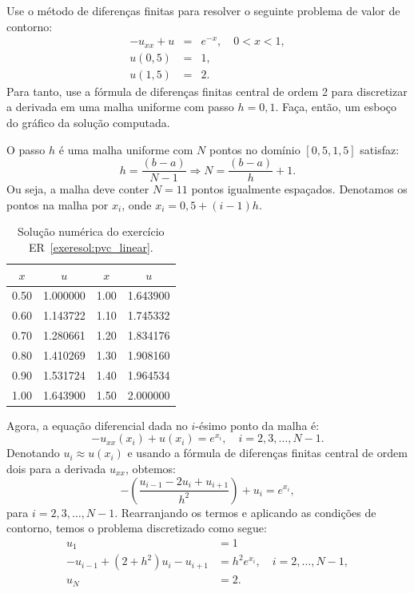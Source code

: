\begin{exeresol}\label{exeresol:pvc_linear} Use o método de diferenças finitas para resolver o seguinte problema de valor de contorno:
  \begin{eqnarray}
    -u_{xx} + u  &=& e^{-x},\quad 0<x<1,\\
    u(0,5) &=& 1,\\
    u(1,5) &=& 2.
  \end{eqnarray}
Para tanto, use a fórmula de diferenças finitas central de ordem 2 para discretizar a derivada em uma malha uniforme com passo $h=0,1$. Faça, então, um esboço do gráfico da solução computada.
\end{exeresol}
\begin{resol}
O passo $h$ é uma malha uniforme com $N$ pontos no domínio $[0,5, 1,5]$ satisfaz:
\begin{equation*}
  h = \frac{(b-a)}{N-1} \Rightarrow N = \frac{(b-a)}{h} + 1.
\end{equation*}
Ou seja, a malha deve conter $N = 11$ pontos igualmente espaçados. Denotamos os pontos na malha por $x_i$, onde $x_i = 0,5 + (i-1)h$.

\begin{table}
  \centering
  \begin{tabular}{cc|cc}
    $x$ & $u$ & $x$ & $u$\\\hline
0.50 & 1.000000 & 1.00 & 1.643900 \\
0.60 & 1.143722 & 1.10 & 1.745332 \\
0.70 & 1.280661 & 1.20 & 1.834176 \\
0.80 & 1.410269 & 1.30 & 1.908160 \\
0.90 & 1.531724 & 1.40 & 1.964534 \\
1.00 & 1.643900 & 1.50 & 2.000000 \\\hline
  \end{tabular}
  \caption{Solução numérica do exercício ER~\ref{exeresol:pvc_linear}.}
  \label{tab:exeresol_pvc_linear}
\end{table}

Agora, a equação diferencial dada no $i$-ésimo ponto da malha é:
\begin{equation*}
  -u_{xx}(x_i) + u(x_i) = e^{x_i},\quad i = 2, 3, \dotsc, N-1.
\end{equation*}
Denotando $u_i \approx u(x_i)$ e usando a fórmula de diferenças finitas central de ordem dois para a derivada $u_{xx}$, obtemos:
\begin{equation*}
  -\left(\frac{u_{i-1} - 2u_i + u_{i+1}}{h^2}\right) + u_i = e^{x_i},
\end{equation*}
para $i= 2, 3, \dotsc, N-1$. Rearranjando os termos e aplicando as condições de contorno, temos o problema discretizado como segue:
\begin{equation*}
  \begin{split}
    u_1 &= 1\\
    -u_{i-1} + (2 + h^2)u_i - u_{i+1} &= h^2e^{x_i},\quad i=2 ,\dotsc, N-1,\\
    u_N &= 2.
  \end{split}
\end{equation*}


\end{resol}
